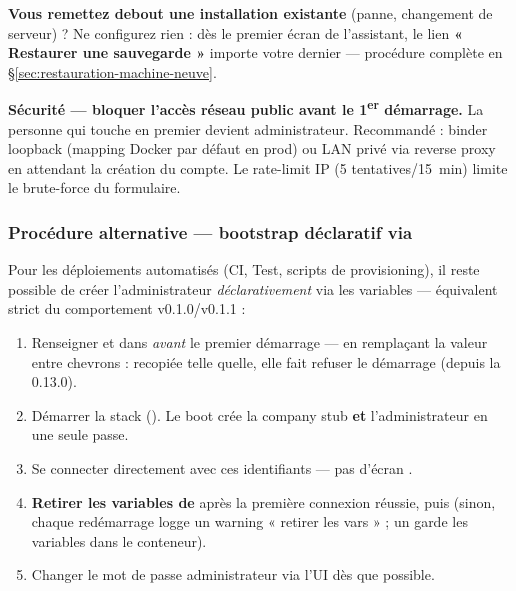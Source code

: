 \documentclass[a4paper,11pt,oneside]{article}
\begin{document}
\textbf{Vous remettez debout une installation existante} (panne, changement de serveur) ? Ne configurez rien : dès le premier écran de l'assistant, le lien \textbf{« Restaurer une sauvegarde »} importe votre dernier  --- procédure complète en \S\ref{sec:restauration-machine-neuve}.

\begin{keshwarning}
\textbf{Sécurité — bloquer l'accès réseau public avant le 1\textsuperscript{er} démarrage.} La personne qui touche  en premier devient administrateur. Recommandé : binder loopback  (mapping Docker par défaut en prod) ou LAN privé via reverse proxy en attendant la création du compte. Le rate-limit IP (5 tentatives/15~min) limite le brute-force du formulaire.
\end{keshwarning}

\subsubsection{Procédure alternative — bootstrap déclaratif via }

Pour les déploiements automatisés (CI, Test, scripts de provisioning), il reste possible de créer l'administrateur \emph{déclarativement} via les variables  — équivalent strict du comportement v0.1.0/v0.1.1 :

\begin{enumerate}
    \item Renseigner  et  dans  \emph{avant} le premier démarrage --- en remplaçant la valeur entre chevrons : recopiée telle quelle, elle fait refuser le démarrage (depuis la 0.13.0).
    \item Démarrer la stack (). Le boot crée la company stub \textbf{et} l'administrateur en une seule passe.
    \item Se connecter directement avec ces identifiants — pas d'écran .
    \item \textbf{Retirer les variables  de } après la première connexion réussie, puis  (sinon, chaque redémarrage logge un warning « retirer les vars » ; un  garde les variables dans le conteneur).
    \item Changer le mot de passe administrateur via l'UI dès que possible.
\end{enumerate}
\end{document}
